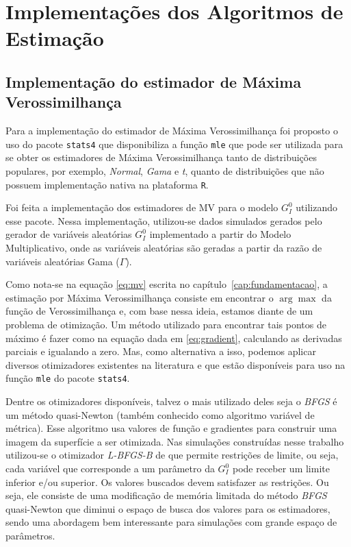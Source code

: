 \section{Implementações dos Algoritmos de Estimação}

\subsection{Implementação do estimador de Máxima Verossimilhança}

Para a implementação do estimador de Máxima Verossimilhança foi proposto o uso do pacote \texttt{stats4} que disponibiliza a função \texttt{mle} que pode ser utilizada para se obter os estimadores de Máxima Verossimilhança tanto de distribuições populares, por exemplo, \textit{Normal}, \textit{Gama} e \textit{t}, quanto de distribuições que não possuem implementação nativa na plataforma \texttt{R}.

Foi feita a implementação dos estimadores de MV para o modelo $G_I^0$ utilizando esse pacote. Nessa implementação, utilizou-se dados simulados gerados pelo gerador de variáveis aleatórias $G_I^0$ implementado a partir do Modelo Multiplicativo, onde as variáveis aleatórias são geradas a partir da razão de variáveis aleatórias Gama ($\Gamma$).

Como nota-se na equação \eqref{eq:mv} escrita no capítulo~\ref{cap:fundamentacao}, a estimação por Máxima Verossimilhança consiste em encontrar o $\arg\max$ da função de Verossimilhança e, com base nessa ideia, estamos diante de um problema de otimização. Um método utilizado para encontrar tais pontos de máximo é fazer como na equação dada em \eqref{eq:gradient}, calculando as derivadas parciais e igualando a zero. Mas, como alternativa a isso, podemos aplicar diversos otimizadores existentes na literatura e que estão disponíveis para uso na função \texttt{mle} do pacote \texttt{stats4}.

Dentre os otimizadores disponíveis, talvez o mais utilizado deles seja o \emph{BFGS} é um método quasi-Newton (também conhecido como algoritmo variável de métrica).  Esse algoritmo usa valores de função e gradientes para construir uma imagem da superfície a ser otimizada. Nas simulações construídas nesse trabalho utilizou-se o otimizador \emph{L-BFGS-B} de \citet{Byrd_1995} que permite restrições de limite, ou seja, cada variável que corresponde a um parâmetro da $G_I^0$ pode receber um limite inferior e/ou superior. Os valores buscados devem satisfazer as restrições. Ou seja, ele consiste de uma modificação de memória limitada do método \emph{BFGS} quasi-Newton que diminui o espaço de busca dos valores para os estimadores, sendo uma abordagem bem interessante para simulações com grande espaço de parâmetros.


